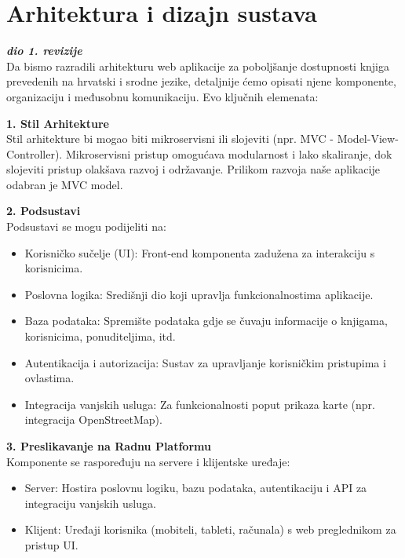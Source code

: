 \chapter{Arhitektura i dizajn sustava}
		
		\textbf{\textit{dio 1. revizije}}\\
Da bismo razradili arhitekturu web aplikacije za poboljšanje dostupnosti knjiga prevedenih na hrvatski i srodne jezike, detaljnije ćemo opisati njene komponente, organizaciju i međusobnu komunikaciju. Evo ključnih elemenata:


        \textbf{1. Stil Arhitekture}\\
        Stil arhitekture bi mogao biti mikroservisni ili slojeviti (npr. MVC - Model-View-Controller). Mikroservisni pristup omogućava modularnost i lako skaliranje, dok slojeviti pristup olakšava razvoj i održavanje. Prilikom razvoja naše aplikacije odabran je MVC model.
        
        \textbf{2. Podsustavi}\\

        Podsustavi se mogu podijeliti na:
        \begin{itemize}
		  \item {Korisničko sučelje (UI): Front-end komponenta zadužena za interakciju s korisnicima.}
		  \item {Poslovna logika: Središnji dio koji upravlja funkcionalnostima aplikacije.}
		  \item {Baza podataka: Spremište podataka gdje se čuvaju informacije o knjigama, korisnicima, ponuditeljima, itd.}		
            \item {Autentikacija i autorizacija: Sustav za upravljanje korisničkim pristupima i ovlastima.}	
             \item {Integracija vanjskih usluga: Za funkcionalnosti poput prikaza karte (npr. integracija OpenStreetMap).}		
	   \end{itemize}

        \textbf{3. Preslikavanje na Radnu Platformu}\\

        Komponente se raspoređuju na servere i klijentske uređaje:
        \begin{itemize}
		  \item {Server: Hostira poslovnu logiku, bazu podataka, autentikaciju i API za integraciju vanjskih usluga.}
		  \item {Klijent: Uređaji korisnika (mobiteli, tableti, računala) s web preglednikom za pristup UI.}
	   \end{itemize}
    
